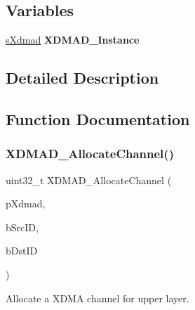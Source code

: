 \subsection*{Variables}
\begin{DoxyCompactItemize}
\item 
\mbox{\label{group__dmad__functions_ga652de4c9494ff2c45db44da97aa31438}} 
\mbox{\hyperlink{group__dmad__structs_gaf2c13151514615a6beb35c0d868a5053}{s\+Xdmad}} {\bfseries X\+D\+M\+A\+D\+\_\+\+Instance}
\end{DoxyCompactItemize}


\subsection{Detailed Description}


\subsection{Function Documentation}
\mbox{\label{group__dmad__functions_gaafb596e6912f388050a8ff98f54b8b8f}} 
\subsubsection{\texorpdfstring{XDMAD\_AllocateChannel()}{XDMAD\_AllocateChannel()}}
{\footnotesize\ttfamily uint32\+\_\+t X\+D\+M\+A\+D\+\_\+\+Allocate\+Channel (\begin{DoxyParamCaption}\item[{\mbox{\hyperlink{group__dmad__structs_gaf2c13151514615a6beb35c0d868a5053}{s\+Xdmad}} $\ast$}]{p\+Xdmad,  }\item[{uint8\+\_\+t}]{b\+Src\+ID,  }\item[{uint8\+\_\+t}]{b\+Dst\+ID }\end{DoxyParamCaption})}



Allocate a X\+D\+MA channel for upper layer. 


